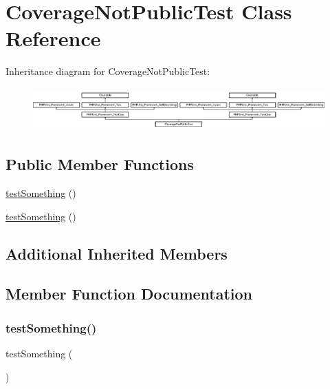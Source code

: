 \hypertarget{class_coverage_not_public_test}{}\section{Coverage\+Not\+Public\+Test Class Reference}
\label{class_coverage_not_public_test}
Inheritance diagram for Coverage\+Not\+Public\+Test\+:\begin{figure}[H]
\begin{center}
\leavevmode
\includegraphics[height=1.651917cm]{class_coverage_not_public_test}
\end{center}
\end{figure}
\subsection*{Public Member Functions}
\begin{DoxyCompactItemize}
\item 
\mbox{\hyperlink{class_coverage_not_public_test_a0fc4e17369bc9607ebdd850d9eda8167}{test\+Something}} ()
\item 
\mbox{\hyperlink{class_coverage_not_public_test_a0fc4e17369bc9607ebdd850d9eda8167}{test\+Something}} ()
\end{DoxyCompactItemize}
\subsection*{Additional Inherited Members}


\subsection{Member Function Documentation}
\mbox{\label{class_coverage_not_public_test_a0fc4e17369bc9607ebdd850d9eda8167}} 
\subsubsection{\texorpdfstring{test\+Something()}{testSomething()}\hspace{0.1cm}{\footnotesize\ttfamily [1/2]}}
{\footnotesize\ttfamily test\+Something (\begin{DoxyParamCaption}{ }\end{DoxyParamCaption})}

